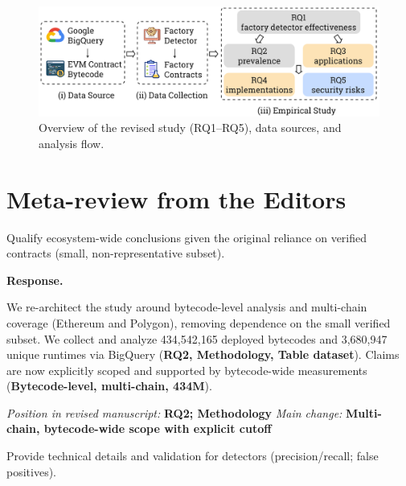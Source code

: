 \documentclass[acmsmall]{acmart}
\begin{document}
\vspace{0.5em}
\begin{figure}[t]
		\centering
		\includegraphics[width=0.9\linewidth]{figure/overview.pdf}
		\caption{Overview of the revised study (RQ1--RQ5), data sources, and analysis flow.}
		\label{fig:overview}
	\end{figure}

	\newpage

	\section*{Meta-review from the Editors}

	\begin{tcolorbox}
		[commentbox,title=Editor/AE -- Comment 1] Qualify ecosystem-wide conclusions given the
		original reliance on verified contracts (small, non-representative subset).
	\end{tcolorbox}

	\noindent
	\textbf{Response.}

	We re-architect the study around bytecode-level analysis and multi-chain coverage (Ethereum and Polygon),
	removing dependence on the small verified subset. We collect and analyze 434,542,165 deployed
	bytecodes and 3,680,947 unique runtimes via BigQuery ({\textbf{RQ2, Methodology, Table dataset}}).
	Claims are now explicitly scoped and supported by bytecode-wide measurements ({\textbf{Bytecode-level, multi-chain, 434M}}).

\vspace{0.25em}
\noindent\textit{Position in revised manuscript:} {\color{red}\textbf{RQ2; Methodology}}
\noindent\textit{Main change:} {\color{blue}\textbf{Multi-chain, bytecode-wide scope with explicit cutoff}}

	\begin{tcolorbox}
		[commentbox,title=Editor/AE -- Comment 2] Provide technical details and validation for
		detectors (precision/recall; false positives).
	\end{tcolorbox}
\end{document}
